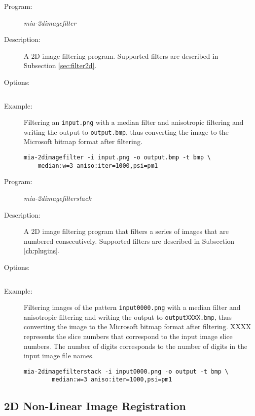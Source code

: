 \begin{description}
\item [Program:]\emph{mia-2dimagefilter}
\item [Description:]A 2D image filtering program. Supported filters are described in Subsection \ref{sec:filter2d}. 
\item [Options:] $\:$

\tabstart
\optinfile
\optoutfile
\opttypetwod
\opthelpplugin
\tabend
\item [Example:] Filtering an \texttt{input.png} with a median filter and anisotropic filtering and writing the output to \texttt{output.bmp}, 
		thus converting the image to the Microsoft bitmap format after filtering. 
\begin{lstlisting}
mia-2dimagefilter -i input.png -o output.bmp -t bmp \
	median:w=3 aniso:iter=1000,psi=pm1
\end{lstlisting}
\end{description}

\begin{description}
\item [Program:]\emph{mia-2dimagefilterstack}
\item [Description:]A 2D image filtering program that filters a series of images that are numbered consecutively. 
              Supported filters are described in Subsection \ref{ch:plugins}. 
\item [Options:] $\:$

\tabstart
\optinfile
\optoutbase
\opttypetwod
\opthelpplugin
\tabend
\item [Example:] Filtering images of the pattern \texttt{input0000.png} with a median filter and anisotropic 
                 filtering and writing the output to \texttt{outputXXXX.bmp}, thus converting the image to the Microsoft 
                 bitmap format after filtering. 
		 XXXX represents the slice numbers that correspond to the input image slice numbers. 
                 The number of digits corresponds to the number of digits in the input image file names. 
\begin{lstlisting}
mia-2dimagefilterstack -i input0000.png -o output -t bmp \
        median:w=3 aniso:iter=1000,psi=pm1
\end{lstlisting}
\end{description}


\subsection{2D Non-Linear Image Registration}
\label{sec:reg2d}

